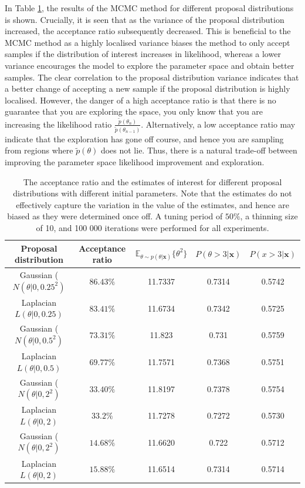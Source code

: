 \documentclass{article}
\begin{document}
	In Table \ref{tab:Q2_results}, the results of the MCMC method for different proposal distributions is shown. Crucially, it is seen that as the variance of the proposal distribution increased, the acceptance ratio subsequently decreased. This is beneficial to the MCMC method as a highly localised variance biases the method to only accept samples if the distribution of interest increases in likelihood, whereas a lower variance encourages the model to explore the parameter space and obtain better samples. The clear correlation to the proposal distribution variance indicates that a better change of accepting a new sample if the proposal distribution is highly localised. However, the danger of a high acceptance ratio is that there is no guarantee that you are exploring the space, you only know that you are increasing the likelihood ratio $\frac{\tilde{p}(\theta_n)}{\tilde{p}(\theta_{n - 1})}$. Alternatively, a low acceptance ratio may indicate that the exploration has gone off course, and hence you are sampling from regions where $\tilde{p}(\theta)$ does not lie. Thus, there is a natural trade-off between improving the parameter space likelihood improvement and exploration. 
	\begin{table}[htb!]
		\centering
		\caption{The acceptance ratio and the estimates of interest for different proposal distributions with different initial parameters. Note that the estimates do not effectively capture the variation in the value of the estimates, and hence are biased as they were determined once off. A tuning period of $50\%$, a thinning size of 10, and 100 000 iterations were performed for all experiments.}
		\label{tab:Q2_results}
		\begin{tabular}{@{}ccccc@{}}
			\toprule
			Proposal distribution & Acceptance ratio & $\mathbb{E}_{\theta \sim p(\theta \vert \mathbf{x})} \{\theta^2\}$ & $P(\theta > 3 \vert \mathbf{x})$ & $P(x > 3 \vert \mathbf{x})$ \\ \midrule
			Gaussian ($N(\theta \vert 0, 0.25^2)$ & $86.43 \%$ & 11.7337 & 0.7314 & 0.5742 \\
			Laplacian $L(\theta \vert 0, 0.25)$ & $83.41 \%$ & 11.6734 & 0.7342 & 0.5725 \\
			Gaussian ($N(\theta \vert 0, 0.5^2)$ & $73.31 \%$ & 11.823 & 0.731 & 0.5759 \\
			Laplacian $L(\theta \vert 0, 0.5)$ & $69.77 \%$ & 11.7571 & 0.7368 & 0.5751 \\
			Gaussian ($N(\theta \vert 0, 2^2)$ & $33.40 \%$ & 11.8197 & 0.7378 & 0.5754 \\
			Laplacian $L(\theta \vert 0, 2)$ & $33.2 \%$ & 11.7278 & 0.7272 & 0.5730 \\
			Gaussian ($N(\theta \vert 0, 2^2)$ & $14.68 \%$ & 11.6620 & 0.722 & 0.5712 \\
			Laplacian $L(\theta \vert 0, 2)$ & $15.88 \%$ & 11.6514 & 0.7314 & 0.5714 \\ \bottomrule
		\end{tabular}
	\end{table}
\end{document}
